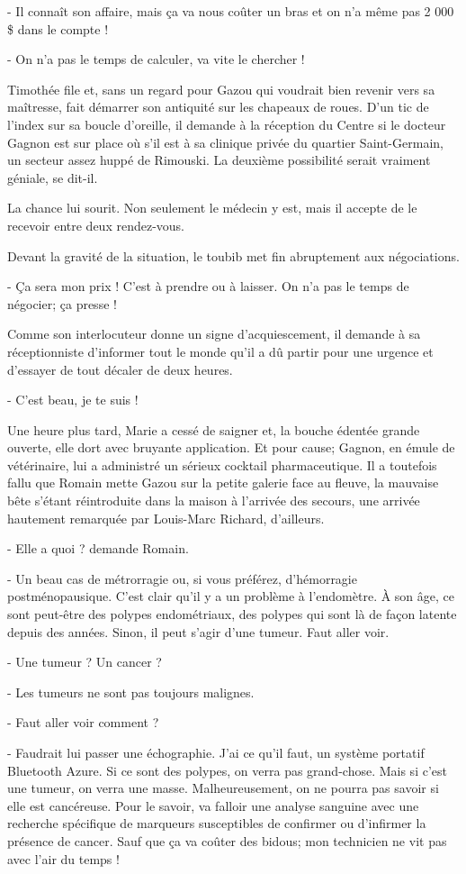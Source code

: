 - Il connaît son affaire, mais ça va nous coûter un bras et on n’a même pas 2 000 \$ dans le compte !

- On n’a pas le temps de calculer, va vite le chercher !

Timothée file et, sans un regard pour Gazou qui voudrait bien revenir vers sa maîtresse, fait démarrer son antiquité sur les chapeaux de roues. D’un tic de l’index sur sa boucle d’oreille, il demande à la réception du Centre si le docteur Gagnon est sur place où s’il est à sa clinique privée du quartier Saint-Germain, un secteur assez huppé de Rimouski. La deuxième possibilité serait vraiment géniale, se dit-il.

La chance lui sourit. Non seulement le médecin y est, mais il accepte de le recevoir entre deux rendez-vous.

Devant la gravité de la situation, le toubib met fin abruptement aux négociations.

- Ça sera mon prix ! C’est à prendre ou à laisser. On n’a pas le temps de négocier; ça presse !

Comme son interlocuteur donne un signe d’acquiescement, il demande à sa réceptionniste d’informer tout le monde qu’il a dû partir pour une urgence et d’essayer de tout décaler de deux heures.

- C’est beau, je te suis !

Une heure plus tard, Marie a cessé de saigner et, la bouche édentée grande ouverte, elle dort avec bruyante application. Et pour cause; Gagnon, en émule de vétérinaire, lui a administré un sérieux cocktail pharmaceutique. Il a toutefois fallu que Romain mette Gazou sur la petite galerie face au fleuve, la mauvaise bête s’étant réintroduite dans la maison à l’arrivée des secours, une arrivée hautement remarquée par Louis-Marc Richard, d’ailleurs.

- Elle a quoi ? demande Romain.

- Un beau cas de métrorragie ou, si vous préférez, d’hémorragie postménopausique. C’est clair qu’il y a un problème à l’endomètre. À son âge, ce sont peut-être des polypes endométriaux, des polypes qui sont là de façon latente depuis des années. Sinon, il peut s’agir d’une tumeur. Faut aller voir.

- Une tumeur ? Un cancer ?

- Les tumeurs ne sont pas toujours malignes.

- Faut aller voir comment ?

- Faudrait lui passer une échographie. J’ai ce qu’il faut, un système portatif Bluetooth Azure. Si ce sont des polypes, on verra pas grand-chose. Mais si c’est une tumeur, on verra une masse. Malheureusement, on ne pourra pas savoir si elle est cancéreuse. Pour le savoir, va falloir une analyse sanguine avec une recherche spécifique de marqueurs susceptibles de confirmer ou d’infirmer la présence de cancer. Sauf que ça va coûter des bidous; mon technicien ne vit pas avec l’air du temps !

